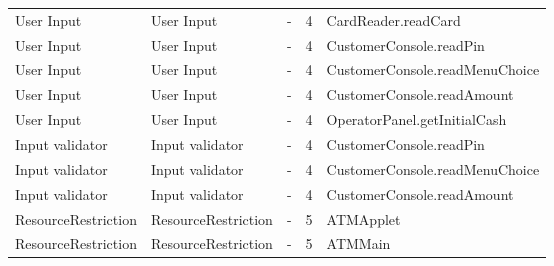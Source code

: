 \begin{table}[]
\begin{center}
\begin{tabular}{p{3.5cm}p{3.5cm}p{3.5cm}ll}
\rowcolor{RowColor}
User Input                               & User Input                           & -                                                                                                              & 4                   & CardReader.readCard            \\
User Input                               & User Input                           & -                                                                                                              & 4                   & CustomerConsole.readPin        \\
\rowcolor{RowColor}
User Input                               & User Input                           & -                                                                                                              & 4                   & CustomerConsole.readMenuChoice \\
User Input                               & User Input                           & -                                                                                                              & 4                   & CustomerConsole.readAmount     \\
\rowcolor{RowColor}
User Input                               & User Input                           & -                                                                                                              & 4                   & OperatorPanel.getInitialCash   \\
Input validator                          & Input validator                      & -                                                                                                              & 4                   & CustomerConsole.readPin        \\
\rowcolor{RowColor}
Input validator                          & Input validator                      & -                                                                                                              & 4                   & CustomerConsole.readMenuChoice \\
Input validator                          & Input validator                      & -                                                                                                              & 4                   & CustomerConsole.readAmount     \\
\rowcolor{RowColor}
ResourceRestriction                      & ResourceRestriction                  & -                                                                                                              & 5                   & ATMApplet                                   \\
ResourceRestriction                      & ResourceRestriction                  & -                                                                                                              & 5                   & ATMMain  \\
\hline
\end{tabular}
\end{center}
\end{table}

